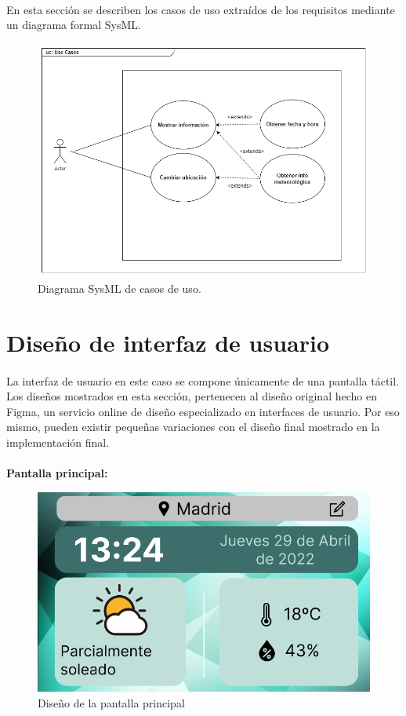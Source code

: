 \paragraph{}En esta sección se describen los casos de uso extraídos de los requisitos
mediante un diagrama formal SysML.

\begin{figure}[H]
	\centering
	\includegraphics[width=0.9\linewidth]{figs/rpi_weather-uc}
	\caption[Diagrama SysML de casos de uso]{Diagrama SysML de casos de uso.}
	\label{fig:use_cases}
\end{figure}

\section{Diseño de interfaz de usuario}

\paragraph{}La interfaz de usuario en este caso se compone únicamente de una pantalla
táctil. Los diseños mostrados en esta sección, pertenecen al diseño original hecho en
Figma, un servicio online de diseño especializado en interfaces de usuario. Por eso mismo,
pueden existir pequeñas variaciones con el diseño final mostrado en la implementación final.

\paragraph{}\textbf{Pantalla principal:}

\begin{figure}[H]
	\centering
	\includegraphics[width=0.75\linewidth]{imgs/figma-main}
	\caption[Diseño de la pantalla principal]{Diseño de la pantalla principal}
	\label{fig:design_main_screen}
\end{figure}


